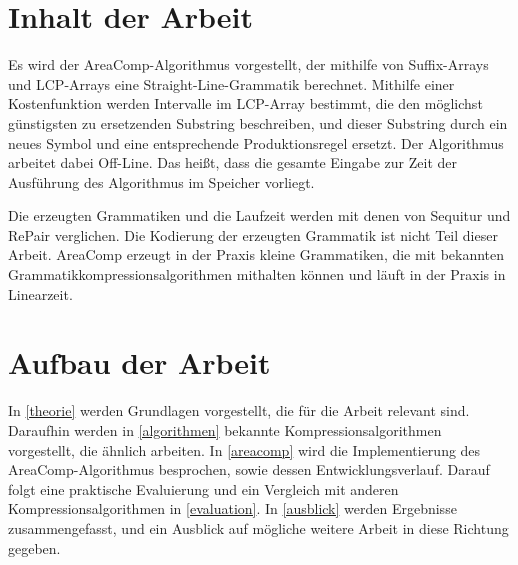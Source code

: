 \section{Inhalt der Arbeit}

Es wird der AreaComp-Algorithmus vorgestellt, der mithilfe von Suffix-Arrays und LCP-Arrays \cite{manber_suffix_1993} eine Straight-Line-Grammatik berechnet. Mithilfe einer Kostenfunktion werden Intervalle im LCP-Array bestimmt, die den möglichst günstigsten zu ersetzenden Substring beschreiben, und dieser Substring durch ein neues Symbol und eine entsprechende Produktionsregel ersetzt.
Der Algorithmus arbeitet dabei Off-Line. Das heißt, dass die gesamte Eingabe zur Zeit der Ausführung des Algorithmus im Speicher vorliegt.

Die erzeugten Grammatiken und die Laufzeit werden mit denen von Sequitur und RePair verglichen. Die Kodierung der erzeugten Grammatik ist nicht Teil dieser Arbeit. 
AreaComp erzeugt in der Praxis kleine Grammatiken, die mit bekannten Grammatikkompressionsalgorithmen mithalten können und läuft in der Praxis in Linearzeit.

\section{Aufbau der Arbeit}

In \autoref{theorie} werden Grundlagen vorgestellt, die für die Arbeit relevant sind. Daraufhin werden in \autoref{algorithmen} bekannte Kompressionsalgorithmen vorgestellt, die ähnlich arbeiten. In \autoref{areacomp} wird die Implementierung des AreaComp-Algorithmus besprochen, sowie dessen Entwicklungsverlauf. Darauf folgt eine praktische Evaluierung und ein Vergleich mit anderen Kompressionsalgorithmen in \autoref{evaluation}. In \autoref{ausblick} werden Ergebnisse zusammengefasst, und ein Ausblick auf mögliche weitere Arbeit in diese Richtung gegeben.